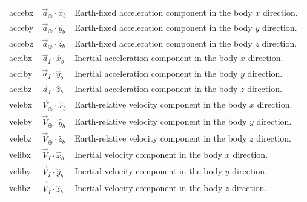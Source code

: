 \begin{longtable}{@{}>{\ttfamily}p{}p{}p{}@{}}
  accebx & $\vec a_{\oplus}\mathbin{\cdot}\hat{x}_b$ &
    Earth-fixed acceleration component in the body $x$ direction.\\
  acceby & $\vec a_{\oplus}\mathbin{\cdot}\hat{y}_b$ &
    Earth-fixed acceleration component in the body $y$ direction.\\
  accebz & $\vec a_{\oplus}\mathbin{\cdot}\hat{z}_b$ &
    Earth-fixed acceleration component in the body $z$ direction.\\
  accibx & $\vec a_I\mathbin{\cdot}\hat{x}_b$ &
    Inertial acceleration component in the body $x$ direction.\\
  acciby & $\vec a_I\mathbin{\cdot}\hat{y}_b$ &
    Inertial acceleration component in the body $y$ direction.\\
  accibz & $\vec a_I\mathbin{\cdot}\hat{z}_b$ &
    Inertial acceleration component in the body $z$ direction.\\
  velebx & $\vec V_{\oplus}\mathbin{\cdot}\hat{x}_b$ &
    Earth-relative velocity component in the body $x$ direction.\\
  veleby & $\vec V_{\oplus}\mathbin{\cdot}\hat{y}_b$ &
    Earth-relative velocity component in the body $y$ direction.\\
  velebz & $\vec V_{\oplus}\mathbin{\cdot}\hat{z}_b$ &
    Earth-relative velocity component in the body $z$ direction.\\
  velibx & $\vec V_I\mathbin{\cdot}\hat{x}_b$ &
    Inertial velocity component in the body $x$ direction.\\
  veliby & $\vec V_I\mathbin{\cdot}\hat{y}_b$ &
    Inertial velocity component in the body $y$ direction.\\
  velibz & $\vec V_I\mathbin{\cdot}\hat{z}_b$ &
    Inertial velocity component in the body $z$ direction.\\
\end{longtable}
